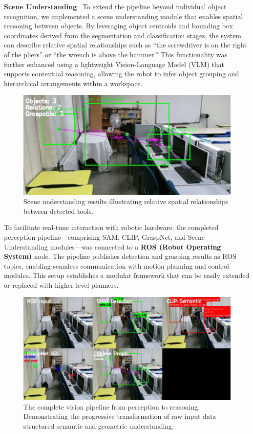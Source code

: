 \documentclass[12pt]{extarticle}
\begin{document}
\textbf{Scene Understanding} \
To extend the pipeline beyond individual object recognition, we implemented a scene understanding module that enables spatial reasoning between objects. By leveraging object centroids and bounding box coordinates derived from the segmentation and classification stages, the system can describe relative spatial relationships such as “the screwdriver is on the right of the pliers” or “the wrench is above the hammer.” This functionality was further enhanced using a lightweight Vision-Language Model (VLM) that supports contextual reasoning, allowing the robot to infer object grouping and hierarchical arrangements within a workspace.

\begin{figure}[htbp]
\centering
\includegraphics[width=0.5\linewidth]{images/scene_understanding.png}
\caption{Scene understanding results illustrating relative spatial relationships between detected tools.}
\label{fig: scene_understanding}
\end{figure}

To facilitate real-time interaction with robotic hardware, the completed perception pipeline—comprising SAM, CLIP, GraspNet, and Scene Understanding modules—was connected to a \textbf{ROS (Robot Operating System)} node. The pipeline publishes detection and grasping results as ROS topics, enabling seamless communication with motion planning and control modules. This setup establishes a modular framework that can be easily extended or replaced with higher-level planners.

\begin{figure}[htbp]
\centering
\includegraphics[width=\linewidth]{images/pipeline_image.png}
\caption{The complete vision pipeline from perception to reasoning. Demonstrating the progressive transformation of raw input data structured semantic and geometric understanding.}
\label{fig: grasp_result}
\end{figure}
\end{document}

